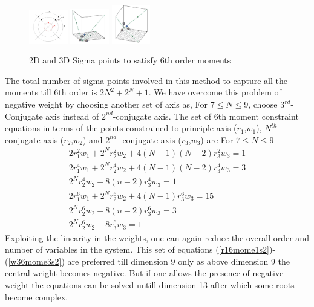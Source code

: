 \documentclass[letterpaper, 10 pt, conference]{ieeeconf}  %
\begin{document}
   \begin{figure}[thpb]
      \centering
      \includegraphics[width=0.15\textwidth]{6thmoment2d1}
      \includegraphics[width=0.15\textwidth]{3d6thmom}
      \includegraphics[width=0.15\textwidth]{3d6thmom2}
      \caption{2D and 3D Sigma points to satisfy 6th order moments}
      \label{fig:23d6m}
   \end{figure}
The total number of sigma points involved in this method to capture all the moments till 6th order is $2N^2+2^N+1$. \newline
We have overcome this problem of negative weight by choosing another set of axis as,  For $7\le N \le9$, choose $3^{rd}$-Conjugate axis instead of $2^{nd}$-conjugate axis. The set of 6th moment constraint equations in terms of the points constrained to principle axis ($r_1$,$w_1$), $N^{th}$- conjugate axis ($r_2$,$w_2$) and $2^{nd}$- conjugate axis ($r_3$,$w_3$) are 
For $7\le N \le9$
\setlength{\arraycolsep}{0.0em}
\begin{eqnarray}
2r_1^2w_1+2^Nr_2^2w_2+4(N-1)(N-2)r_3^2w_3=1\label{r16mome1s2}\\
2r_1^4w_1+2^Nr_2^4w_2+4(N-1)(N-2)r_3^4w_3=3\label{r26mome2s2}\\
2^Nr_2^4w_2+8(n-2)r_3^4w_3=1\label{r36mome3s2}\\
2r_1^6w_1+2^Nr_2^6w_2+4(N-1)r_3^6w_3=15\label{w16mome1s2}\\
2^Nr_2^6w_2+8(n-2)r_3^6w_3=3\label{w26mome2s2}\\
2^Nr_2^6w_2+8r_3^6w_3=1\label{w36mome3s2}
\end{eqnarray}
\setlength{\arraycolsep}{5pt}
Exploiting the linearity in the weights, one can again reduce the overall order and number of variables in the system. This set of equations (\ref{r16mome1s2})-(\ref{w36mome3s2}) are preferred till dimension 9 only as above dimension 9 the central weight becomes negative. But if one allows the presence of negative weight the equations can be solved untill dimension 13 after which some roots become complex. 
\end{document}
